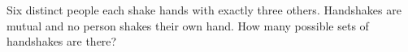 Six distinct people each shake hands with exactly three others. Handshakes are mutual and no person shakes their own hand. How many possible sets of handshakes are there?
